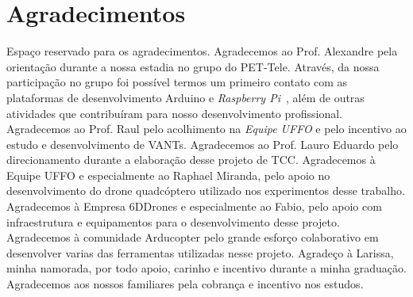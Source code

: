 \documentclass[12pt,a4paper,oneside]{book}
\begin{document}
\chapter*{Agradecimentos}

\thispagestyle{myheadings}
%
Espaço reservado para os agradecimentos.
%
Agradecemos ao Prof. Alexandre pela orientação durante a nossa estadia no grupo do PET-Tele. Através, 
da nossa participação no grupo foi possível termos um primeiro contato com as plataformas de desenvolvimento 
Arduino e \textit{Raspberry Pi}~\cite{url:raspberrypi}, além de outras atividades que contribuíram para nosso
desenvolvimento profissional.
%
Agradecemos ao Prof. Raul pelo acolhimento na \textit{Equipe UFFO} e pelo incentivo ao estudo e desenvolvimento 
de VANTs. 
%
Agradecemos ao Prof. Lauro Eduardo pelo direcionamento durante a elaboração desse projeto de TCC. 
%
Agradecemos à Equipe UFFO e especialmente ao Raphael Miranda, pelo apoio no desenvolvimento do drone quadcóptero 
utilizado nos experimentos desse trabalho. 
%
Agradecemos à Empresa 6DDrones e especialmente ao Fabio, pelo apoio com infraestrutura e equipamentos para o desenvolvimento 
desse projeto.
%
Agradecemos à comunidade Arducopter pelo grande esforço colaborativo em desenvolver varias das ferramentas utilizadas nesse projeto.
%
Agradeço à Larissa, minha namorada, por todo apoio, carinho e incentivo durante a minha graduação.
%
Agradecemos aos nossos familiares pela cobrança e incentivo nos estudos.
%


%
\listoffigures
%
%
\thispagestyle{myheadings}
%


%
\listoftables
%
%
\thispagestyle{myheadings}
%


%
\tableofcontents
%
\thispagestyle{myheadings}
\end{document}
